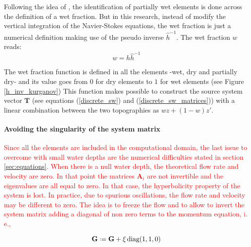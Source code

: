 \documentclass[a4paper,12pt]{elsarticle}
\newcommand{\Miguel}[1]{\textcolor{red}{#1}}
\newcommand{\defeq}{\mathrel{\vcenter{\baselineskip0.5ex\lineskiplimit0pt\hbox{\scriptsize.}\hbox{\scriptsize.}}}=}
\begin{document}
Following the idea of \cite{defina2000}, the identification of partially wet elements is done across the definition of a wet fraction. But in this research, instead of modify the vertical integration of the Navier-Stokes equations, the wet fraction is just a numerical definition making use of the pseudo inverse $\hat{h}^{-1}$. The wet fraction $w$ reads:
\begin{equation}
w = h\hat{h}^{-1}
\end{equation}

The wet fraction function is defined in all the elements -wet, dry and partially dry- and its value goes from $0$ for dry elements to $1$ for wet elements (see Figure \ref{h_inv_kurganov})
This function makes possible to construct the source system vector $\mathbf{T}$ (see equations (\ref{discrete_sw}) and (\ref{discrete_sw_matrices})) with a linear combination between the two topographies as $wz + (1-w)z'$.


\paragraph{Avoiding the singularity of the system matrix}
\Miguel{%
Since all the elements are included in the computational domain, the last issue to overcome with small water depths are the numerical difficulties stated in section \ref{sec:equations}.
When there is a null water depth, the theoretical flow rate and velocity are zero. In that point the matrices $\mathbf{A}_i$ are not invertible and the eigenvalues are all equal to zero. In that case, the hyperbolicity property of the system is lost.
In practice, due to spurious oscillations, the flow rate and velocity may be different to zero. The idea is to freeze the flow and to allow to invert the system matrix adding a diagonal of non zero terms to the momentum equation, i. e.,
}

\begin{equation}
\mathbf{G} \defeq \mathbf{G} + \xi\,\text{diag}(1, 1, 0)
\end{equation}

\end{document}
